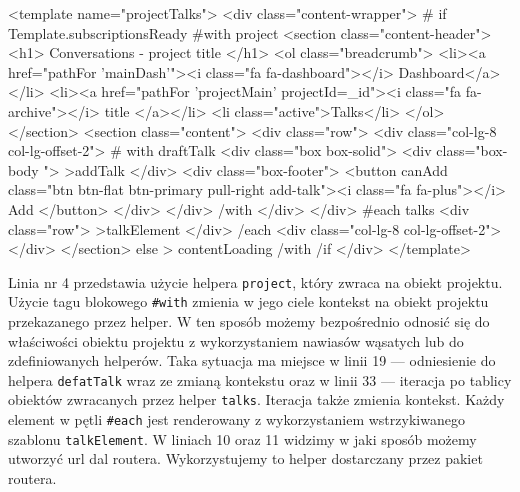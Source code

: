 \begin{html}[caption={Przykładowy szablon},label={lst:projectTalks_templ}]
<template name="projectTalks">
    <div class="content-wrapper">
        {{# if Template.subscriptionsReady}}
            {{#with project }}
                <section class="content-header">
                    <h1>
                        Conversations - project {{title}}
                    </h1>
                    <ol class="breadcrumb">
                        <li><a href="{{pathFor 'mainDash'}}"><i class="fa fa-dashboard"></i> Dashboard</a></li>
                        <li><a href="{{pathFor 'projectMain' projectId=_id}}"><i class="fa fa-archive"></i> {{title}}
                        </a></li>
                        <li class="active">Talks</li>
                    </ol>
                </section>
                <section class="content">
                    <div class="row">
                        <div class="col-lg-8 col-lg-offset-2">
                            {{# with draftTalk}}
                                <div class="box box-solid">
                                    <div class="box-body ">
                                        {{>addTalk }}
                                    </div>
                                    <div class="box-footer">
                                        <button {{canAdd}} class="btn btn-flat btn-primary pull-right add-talk"><i
                                                class="fa fa-plus"></i> Add
                                        </button>
                                    </div>
                                </div>
                            {{/with}}
                        </div>
                    </div>
                    {{#each talks}}
                        <div class="row">
                            {{>talkElement }}
                        </div>
                    {{/each}}
                    <div class="col-lg-8 col-lg-offset-2">
                    </div>
                </section>
            {{else}}
                {{> contentLoading }}
            {{/with}}
        {{/if}}
    </div>
</template>
\end{html}
Linia nr 4 przedstawia użycie helpera \verb|project|, który zwraca na obiekt projektu. Użycie tagu blokowego \verb|#with| zmienia w jego ciele kontekst na obiekt projektu przekazanego przez helper. W ten sposób możemy bezpośrednio odnosić się do właściwości obiektu projektu z wykorzystaniem nawiasów wąsatych lub do zdefiniowanych helperów. Taka sytuacja ma miejsce w linii 19 --- odniesienie do helpera \verb|defatTalk| wraz ze zmianą kontekstu oraz w linii 33 --- iteracja po tablicy obiektów zwracanych przez helper \verb|talks|. Iteracja także zmienia kontekst. Każdy element w pętli \verb|#each| jest renderowany z wykorzystaniem wstrzykiwanego szablonu \verb|talkElement|. W liniach 10 oraz 11 widzimy w jaki sposób możemy utworzyć url dal routera. Wykorzystujemy to helper dostarczany przez pakiet routera.


